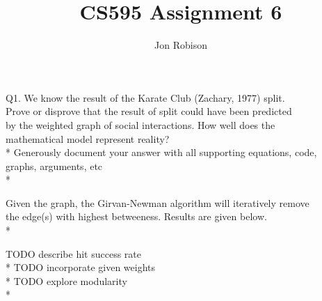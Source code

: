 \documentclass{article}
\begin{document}
\author{Jon Robison}
\title{CS595 Assignment 6}
\maketitle

Q1. We know the result of the Karate Club (Zachary, 1977) split.\\
Prove or disprove that the result of split could have been predicted\\
by the weighted graph of social interactions.  How well does the\\
mathematical model represent reality?\\*
Generously document your answer with all supporting equations, code,\\
graphs, arguments, etc\\*

Given the graph, the Girvan-Newman algorithm will iteratively remove\\
the edge(s) with highest betweeness. Results are given below.\\*

TODO describe hit success rate\\*
TODO incorporate given weights\\*
TODO explore modularity\\*
\end{document}
